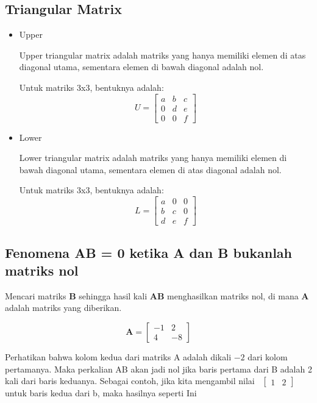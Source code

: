 \documentclass{article}
\begin{document}
\subsection{Triangular Matrix}
\begin{itemize}
    \item Upper

          Upper triangular matrix adalah matriks yang hanya memiliki elemen di atas diagonal utama, sementara elemen di bawah diagonal adalah nol.

          Untuk matriks 3x3, bentuknya adalah:
          \[ U = \begin{bmatrix} a & b & c \\ 0 & d & e \\ 0 & 0 & f \end{bmatrix} \]
    \item Lower

          Lower triangular matrix adalah matriks yang hanya memiliki elemen di bawah diagonal utama, sementara elemen di atas diagonal adalah nol.

          Untuk matriks 3x3, bentuknya adalah:
          \[ L = \begin{bmatrix} a & 0 & 0 \\ b & c & 0 \\ d & e & f \end{bmatrix} \]
\end{itemize}

\subsection{Fenomena AB = 0 ketika A dan B bukanlah matriks nol}
Mencari matriks \( \textbf{B} \) sehingga hasil kali \( \textbf{AB} \) menghasilkan matriks nol, di mana \( \textbf{A} \) adalah matriks yang diberikan.

\[
    \textbf{A} = \begin{bmatrix}
        -1 & 2  \\
        4  & -8
    \end{bmatrix}
\]

Perhatikan bahwa kolom kedua dari matriks A adalah dikali \(-2\) dari kolom pertamanya. Maka perkalian AB akan jadi nol jika baris pertama dari B adalah 2 kali dari baris keduanya. Sebagai contoh, jika kita mengambil nilai \  \( \begin{bmatrix} 1 & 2 \end{bmatrix} \) untuk baris kedua dari b, maka hasilnya seperti Ini
\end{document}
